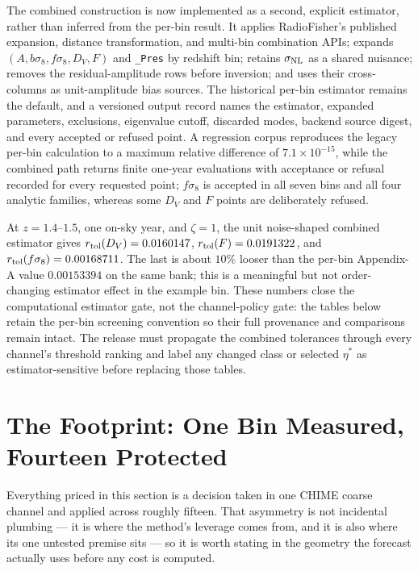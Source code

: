 The combined construction is now implemented as a second, explicit estimator,
rather than inferred from the per-bin result.  It applies RadioFisher's
published expansion, distance transformation, and multi-bin combination APIs;
expands $(A,b\sigma_8,f\sigma_8,D_V,F)$ and \texttt{\_Pres} by redshift bin; retains
$\sigma_{\rm NL}$ as a shared nuisance; removes the residual-amplitude rows
before inversion; and uses their cross-columns as unit-amplitude bias sources.
The historical per-bin estimator remains the default, and a versioned output
record names the estimator, expanded parameters, exclusions, eigenvalue
cutoff, discarded modes, backend source digest, and every accepted or refused
point.  A regression corpus reproduces the legacy per-bin calculation to a
maximum relative difference of $7.1\times10^{-15}$, while the combined path
returns finite one-year evaluations with acceptance or refusal recorded for
every requested point; $f\sigma_8$ is accepted in all seven bins and all four
analytic families, whereas some $D_V$ and $F$ points are deliberately refused.

At $z=1.4$--$1.5$, one on-sky year, and $\zeta=1$, the unit noise-shaped
combined estimator gives
$r_{\rm tol}(D_V)=0.0160147$,
$r_{\rm tol}(F)=0.0191322$, and
$r_{\rm tol}(f\sigma_8)=0.00168711$.  The last is about $10\%$ looser than the
per-bin Appendix-A value $0.00153394$ on the same bank; this is a meaningful
but not order-changing estimator effect in the example bin.  These numbers
close the computational estimator gate, not the channel-policy gate: the
tables below retain the per-bin screening convention so their full provenance
and comparisons remain intact.  The release must propagate the combined
tolerances through every channel's threshold ranking and label any changed
class or selected $\eta^*$ as estimator-sensitive before replacing those
tables.

\section{The Footprint: One Bin Measured, Fourteen Protected}
\label{sec:tolerance:footprint}

Everything priced in this section is a decision taken in one CHIME coarse channel and applied across roughly fifteen. That asymmetry is not incidental plumbing --- it is where the method's leverage comes from, and it is also where its one untested premise sits --- so it is worth stating in the geometry the forecast actually uses before any cost is computed.

